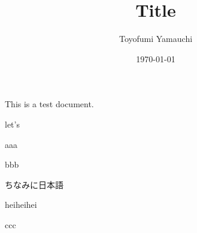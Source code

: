 \documentclass[letterpaper,oneside,12pt]{ltjsarticle}
\title{Title}
\author{Toyofumi Yamauchi}
\date{\monthdayyeardate\today}
\begin{document}
\maketitle

This is a test document.

let's

aaa

bbb

ちなみに日本語

heiheihei

ccc
\end{document}
